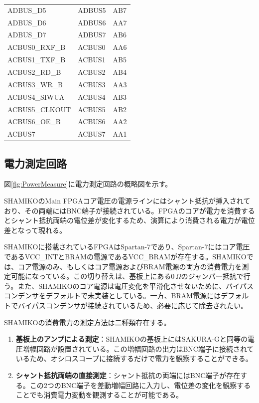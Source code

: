 \documentclass[dvipdfmx]{jlreq}
\begin{document}
\begin{table}[htbp]
\begin{minipage}[t]{0.48\textwidth}
\begin{tabular}{|l|l|l|}
      ADBUS\_D5 & ADBUS5 & AB7 \\
      ADBUS\_D6 & ADBUS6 & AA7 \\
      ADBUS\_D7 & ADBUS7 & AB6 \\
      ACBUS0\_RXF\_B & ACBUS0 & AA6 \\
      ACBUS1\_TXF\_B & ACBUS1 & AB5 \\
      ACBUS2\_RD\_B & ACBUS2 & AB4 \\
      ACBUS3\_WR\_B & ACBUS3 & AA3 \\
      ACBUS4\_SIWUA & ACBUS4 & AB3 \\
      ACBUS5\_CLKOUT & ACBUS5 & AB2 \\
      ACBUS6\_OE\_B & ACBUS6 & AA2 \\
      ACBUS7 & ACBUS7 & AA1 \\ \hline
    \end{tabular}
  \end{minipage}
\end{table}


\subsection{電力測定回路}
\label{sec:power_measure}
図\ref{fig:PowerMeasure}に電力測定回路の概略図を示す。

SHAMIKOのMain FPGAコア電圧の電源ラインにはシャント抵抗が挿入されており、その両端にはBNC端子が接続されている。FPGAのコアが電力を消費するとシャント抵抗両端の電位差が変化するため、演算により消費される電力が電位差となって現れる。

SHAMIKOに搭載されているFPGAはSpartan-7であり、Spartan-7にはコア電圧であるVCC\_INTとBRAMの電源であるVCC\_BRAMが存在する。SHAMIKOでは、コア電源のみ、もしくはコア電源およびBRAM電源の両方の消費電力を測定可能になっている。この切り替えは、基板上にある0\,$\Omega$のジャンパー抵抗で行う。また、SHAMIKOのコア電源は電圧変化を平滑化させないために、バイパスコンデンサをデフォルトで未実装としている。一方、BRAM電源にはデフォルトでバイパスコンデンサが接続されているため、必要に応じて除去されたい。

SHAMIKOの消費電力の測定方法は二種類存在する。
\begin{enumerate}
  \item \textbf{基板上のアンプによる測定}：SHAMIKOの基板上にはSAKURA-Gと同等の電圧増幅回路が設置されている。この増幅回路の出力はBNC端子に接続されているため、オシロスコープに接続するだけで電力を観察することができる。
  \item \textbf{シャント抵抗両端の直接測定}：シャント抵抗の両端にはBNC端子が存在する。この2つのBNC端子を差動増幅回路に入力し、電位差の変化を観察することでも消費電力変動を観測することが可能である。
\end{enumerate}
\end{document}
